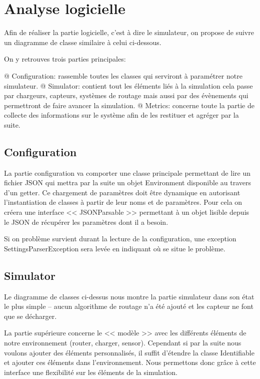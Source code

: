 \documentclass[noposter,final]{polytech/polytech}
\begin{document}
	\section{Analyse logicielle}
		Afin de réaliser la partie logicielle, c'est à dire le simulateur, on propose de suivre un diagramme de classe similaire à celui ci-dessous.
		
		
		On y retrouves trois parties principales:
		\begin{easylist}[itemize]
			@ Configuration: rassemble toutes les classes qui serviront à paramétrer notre simulateur.
			@ Simulator: contient tout les éléments liés à la simulation cela passe par chargeurs, capteurs, systèmes de routage mais aussi par des évènements qui permettront de faire avancer la simulation.
			@ Metrics: concerne toute la partie de collecte des informations sur le système afin de les restituer et agréger par la suite. 	
		\end{easylist}

		\subsection{Configuration}
			
			La partie configuration va comporter une classe principale permettant de lire un fichier JSON qui mettra par la suite un objet Environment disponible au travers d'un getter.
			Ce chargement de paramètres doit être dynamique en autorisant l'instantiation de classes à partir de leur noms et de paramètres.
			Pour cela on créera une interface << JSONParsable >> permettant à un objet lisible depuis le JSON de récupérer les paramètres dont il a besoin.
			
			Si on problème survient durant la lecture de la configuration, une exception SettingsParserException sera levée en indiquant où se situe le problème.
		
		\subsection{Simulator}
						
			Le diagramme de classes ci-dessus nous montre la partie simulateur dans son état le plus simple -- aucun algorithme de routage n'a été ajouté et les capteur ne font que se décharger.
			
			La partie supérieure concerne le << modèle >> avec les différents éléments de notre environnement (router, charger, sensor).
			Cependant si par la suite nous voulons ajouter des éléments personnalisés, il suffit d'étendre la classe Identifiable et ajouter ces éléments dans l'environnement.
			Nous permettons donc grâce à cette interface une flexibilité sur les éléments de la simulation.
			
\end{document}
